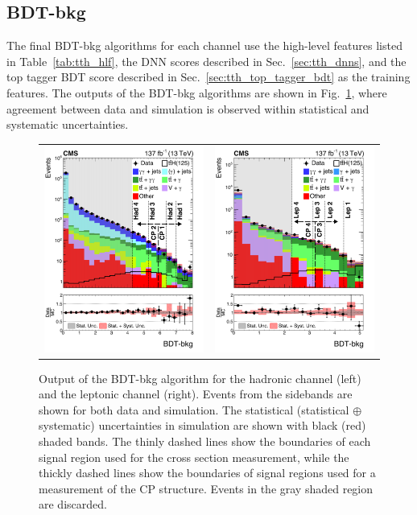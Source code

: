 \subsection{BDT-bkg}
The final BDT-bkg algorithms for each channel use the high-level features listed in Table~\ref{tab:tth_hlf}, the DNN scores described in Sec.~\ref{sec:tth_dnns}, and the top tagger BDT score described in Sec.~\ref{sec:tth_top_tagger_bdt} as the training features.
The outputs of the BDT-bkg algorithms are shown in Fig.~\ref{fig:tth_bdt-bkg}, where agreement between data and simulation is observed within statistical and systematic uncertainties.
\begin{figure} [htbp!]
    \centering
    \begin{tabular}{c c}
        \includegraphics[width=0.48\linewidth]{figures/tth/CMS-HIG-19-013_Figure_001-a.png} &
        \includegraphics[width=0.48\linewidth]{figures/tth/CMS-HIG-19-013_Figure_001-b.png}
    \end{tabular}
    \caption{Output of the BDT-bkg algorithm for the hadronic channel (left) and the leptonic channel (right). Events from the \mgg sidebands are shown for both data and simulation. The statistical (statistical $\oplus$ systematic) uncertainties in simulation are shown with black (red) shaded bands. The thinly dashed lines show the boundaries of each signal region used for the cross section measurement, while the thickly dashed lines show the boundaries of signal regions used for a measurement of the CP structure. Events in the gray shaded region are discarded.}
    \label{fig:tth_bdt-bkg}
\end{figure}

